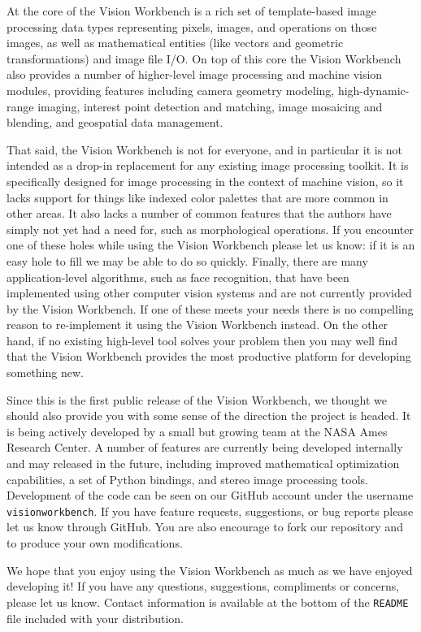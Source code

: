 At the core of the Vision Workbench is a rich set of template-based
image processing data types representing pixels, images, and
operations on those images, as well as mathematical entities (like
vectors and geometric transformations) and image file I/O.  On top of
this core the Vision Workbench also provides a number of higher-level
image processing and machine vision modules, providing features
including camera geometry modeling, high-dynamic-range imaging,
interest point detection and matching, image mosaicing and blending,
and geospatial data management.

That said, the Vision Workbench is not for everyone, and in particular
it is not intended as a drop-in replacement for any existing image
processing toolkit.  It is specifically designed for image processing
in the context of machine vision, so it lacks support for things like
indexed color palettes that are more common in other areas.  It also
lacks a number of common features that the authors have simply not yet
had a need for, such as morphological operations.  If you encounter one
of these holes while using the Vision Workbench please let us know: if
it is an easy hole to fill we may be able to do so quickly.  Finally,
there are many application-level algorithms, such as face recognition,
that have been implemented using other computer vision systems and are
not currently provided by the Vision Workbench.  If one of these meets
your needs there is no compelling reason to re-implement it using the
Vision Workbench instead.  On the other hand, if no existing
high-level tool solves your problem then you may well find that the
Vision Workbench provides the most productive platform for developing
something new.

Since this is the first public release of the Vision Workbench, we
thought we should also provide you with some sense of the direction
the project is headed.  It is being actively developed by a small but
growing team at the NASA Ames Research Center.  A number of features
are currently being developed internally and may released in the
future, including improved mathematical optimization capabilities, a
set of Python bindings, and stereo image processing tools. Development
of the code can be seen on our GitHub account under the username
\verb#visionworkbench#. If you have feature requests, suggestions, or
bug reports please let us know through GitHub. You are also encourage
to fork our repository and to produce your own modifications.

We hope that you enjoy using the Vision Workbench as much as we have
enjoyed developing it!  If you have any questions, suggestions,
compliments or concerns, please let us know.  Contact information is
available at the bottom of the \verb#README# file included with your
distribution.
